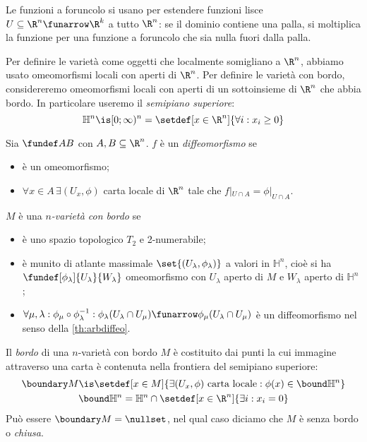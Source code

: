 Le funzioni a foruncolo si usano per estendere
funzioni lisce $U\subseteq\R^n\funarrow\R^k$ a tutto $\R^n$:
se il dominio contiene una palla,
si moltiplica la funzione per una funzione a foruncolo
che sia nulla fuori dalla palla.
 

Per definire le varietà come oggetti che localmente somigliano a $\R^n$,
abbiamo usato omeomorfismi locali con aperti di $\R^n$.
Per definire le varietà con bordo,
considereremo omeomorfismi locali con aperti di un sottoinsieme di $\R^n$ che abbia bordo.
In particolare useremo il \emph{semipiano superiore}:
\[\mathbb H^n\is[0;\infty)^n=\setdef[x\in\R^n]{\forall i:x_i\ge 0}\]

\begin{defn}
	\label{th:arbdiffeo}
	Sia $\fundef AB$ con $A,B\subseteq \R^n$.
	$f$ è un \emph{diffeomorfismo} se
	\begin{itemize}
		\item è un omeomorfismo;
		\item
			$\forall x\in A \,\exists (U_x,\phi)$ carta locale di $\R^n$
			tale che $f|_{U\cap A}=\phi|_{U\cap A}$.
	\end{itemize}
\end{defn}

\begin{defn}
	$M$ è una \emph{$n$-varietà con bordo} se 
	\begin{itemize}
		\item è uno spazio topologico $T_2$ e 2-numerabile;
		\item
			è munito di atlante massimale $\set{(U_\lambda,\phi_\lambda)}$ a valori in $\mathbb H^n$,
			cioè si ha $\fundef[\phi_\lambda]{U_\lambda}{W_\lambda}$ omeomorfismo
			con $U_\lambda$ aperto di $M$ e $W_\lambda$ aperto di $\mathbb H^n$;
		\item
			$\forall \mu,\lambda:
			\phi_\mu\circ\phi_\lambda^{-1}:
			\phi_\lambda(U_\lambda\cap U_\mu) \funarrow \phi_\mu(U_\lambda\cap U_\mu)$
			è un diffeomorfismo nel senso della \autoref{th:arbdiffeo}.
	\end{itemize}
\end{defn}

\begin{defn}[Bordo]
	Il \emph{bordo} di una $n$-varietà con bordo $M$
	è costituito dai punti la cui immagine attraverso una carta
	è contenuta nella frontiera del semipiano superiore:
	\begin{gather*}
		\boundary M \is
		\setdef[x\in M]{\exists(U_x,\phi)\text{ carta locale}:\phi(x) \in \bound \mathbb H^n} \\
		\bound \mathbb H^n =
		\mathbb H^n \cap \setdef[x\in\R^n]{\exists i:x_i=0}
	\end{gather*}
	Può essere $\boundary M=\nullset$,
	nel qual caso diciamo che $M$ è senza bordo o \emph{chiusa}.
\end{defn}


